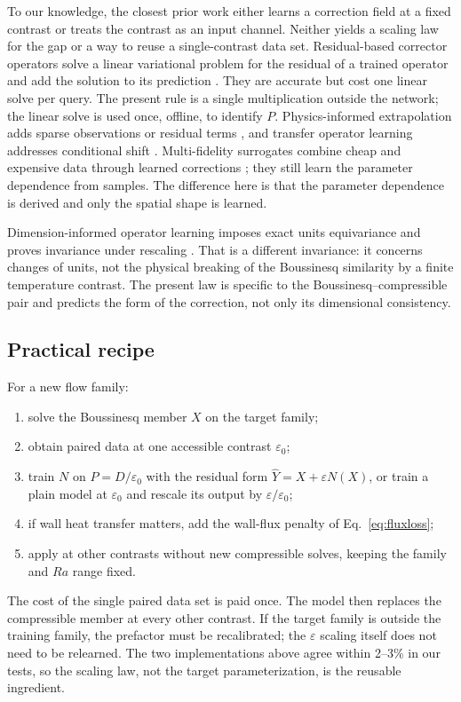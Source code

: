 \documentclass[preprint,11pt,a4paper,times,doubleblind]{elsarticle}
\begin{document}
To our knowledge, the closest prior work either learns a correction field at a fixed contrast or
treats the contrast as an input channel. Neither yields a scaling law for the gap or a way to
reuse a single-contrast data set. Residual-based corrector operators solve a linear variational problem for the residual of a
trained operator and add the solution to its prediction \citep{jha2023residual,cao2023residual}.
They are accurate but cost one linear solve per query. The present rule is a single
multiplication outside the network; the linear solve is used once, offline, to identify $P$.
Physics-informed extrapolation adds sparse observations or residual terms
\citep{zhu2023reliable}, and transfer operator learning addresses conditional shift
\citep{goswami2022deep}. Multi-fidelity surrogates combine cheap and expensive data through
learned corrections \citep{conti2022multi,chen2023feature,lyu2023multi}; they still learn the
parameter dependence from samples. The difference here is that the parameter dependence is
derived and only the spatial shape is learned.

Dimension-informed operator learning imposes exact units equivariance and proves invariance
under rescaling \citep{song2024dimino}. That is a different invariance: it concerns changes of
units, not the physical breaking of the Boussinesq similarity by a finite temperature
contrast. The present law is specific to the Boussinesq--compressible pair and predicts the
form of the correction, not only its dimensional consistency.

\subsection{Practical recipe}

For a new flow family:
\begin{enumerate}
\item solve the Boussinesq member $X$ on the target family;
\item obtain paired data at one accessible contrast $\varepsilon_0$;
\item train $N$ on $P=D/\varepsilon_0$ with the residual form $\hat Y=X+\varepsilon N(X)$,
or train a plain model at $\varepsilon_0$ and rescale its output by
$\varepsilon/\varepsilon_0$;
\item if wall heat transfer matters, add the wall-flux penalty of Eq.~\eqref{eq:fluxloss};
\item apply at other contrasts without new compressible solves, keeping the family and $Ra$
range fixed.
\end{enumerate}
The cost of the single paired data set is paid once. The model then replaces the compressible
member at every other contrast. If the target family is outside the training family, the
prefactor must be recalibrated; the $\varepsilon$ scaling itself does not need to be relearned.
The two implementations above agree within 2--3\% in our tests, so the scaling law, not the
target parameterization, is the reusable ingredient.
\end{document}
